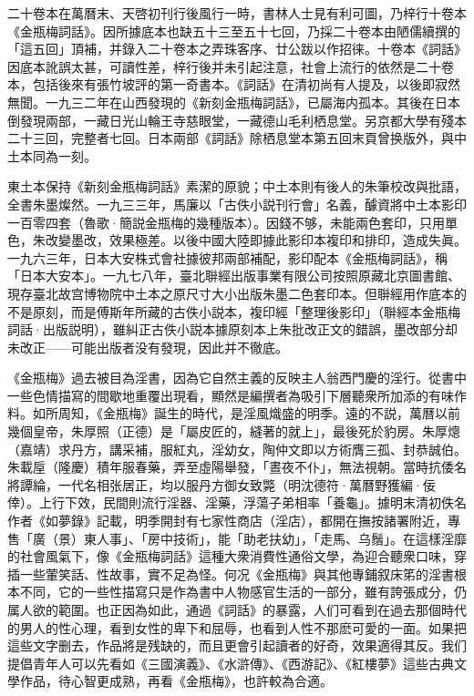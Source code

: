 二十卷本在萬曆末、天啓初刊行後風行一時，書林人士見有利可圖，乃梓行十卷本《金瓶梅詞話》。因所據底本也缺五十三至五十七回，乃採二十卷本由陋儒續撰的「這五回」頂補，并錄入二十卷本之弄珠客序、廿公跋以作招徕。十卷本《詞話》因底本訛誤太甚，可讀性差，梓行後并未引起注意，社會上流行的依然是二十卷本，包括後來有張竹坡評的第一奇書本。《詞話》在清初尚有人提及，以後即寂然無聞。一九三二年在山西發現的《新刻金瓶梅詞話》，已屬海内孤本。其後在日本倒發現兩部，一藏日光山輪王寺慈眼堂，一藏德山毛利栖息堂。另京都大學有殘本二十三回，完整者七回。日本兩部《詞話》除栖息堂本第五回末頁曾换版外，與中土本同為一刻。

東土本保持《新刻金瓶梅詞話》素潔的原貌；中土本則有後人的朱筆校改與批語，全書朱墨燦然。一九三三年，馬廉以「古佚小説刊行會」名義，醵資將中土本影印一百零四套{\innerzhushi（魯歌·簡説金瓶梅的幾種版本）}。因錢不够，未能兩色套印，只用單色，朱改變墨改，效果極差。以後中國大陸即據此影印本複印和排印，造成失眞。一九六三年，日本大安株式會社據彼邦兩部補配，影印配本《金瓶梅詞話》，稱「日本大安本」。一九七八年，臺北聨經出版事業有限公司按照原藏北京圖書館、現存臺北故宫博物院中土本之原尺寸大小出版朱墨二色套印本。但聨經用作底本的不是原刻，而是傅斯年所藏的古佚小説本，複印經「整理後影印」{\innerzhushi（聨經本金瓶梅詞話·出版説明）}，雖糾正古佚小説本據原刻本上朱批改正文的錯誤，墨改部分却未改正——可能出版者没有發現，因此并不徹底。

《金瓶梅》過去被目為淫書，因為它自然主義的反映主人翁西門慶的淫行。從書中一些色情描寫的間歇地重覆出現看，顯然是編撰者為吸引下層聽衆所加添的有味作料。如所周知，《金瓶梅》誕生的時代，是淫風熾盛的明季。遠的不説，萬曆以前幾個皇帝，朱厚照（正德）是「屬皮匠的，縫著的就上」，最後死於豹房。朱厚熜（嘉靖）求丹方，講采補，服紅丸，淫幼女，陶仲文即以方術膺三孤、封恭誠伯。朱載垕（隆慶）積年服春藥，弄至虛陽舉發，「晝夜不仆」，無法視朝。當時抗倭名將譚綸，一代名相张居正，均以服丹方御女致斃{\innerzhushi（明沈德符·萬曆野獲編·佞倖）}。上行下效，民間則流行淫器、淫藥，浮蕩子弟相率「養龜」。據明末清初佚名作者《如夢錄》記載，明季開封有七家性商店（淫店），都開在撫按諸署附近，專售「廣（景）東人事」、「房中技術」，能「助老扶幼」，「走馬、乌鬚」。在這樣淫靡的社會風氣下，像《金瓶梅詞話》這種大衆消費性通俗文學，為迎合聽衆口味，穿插一些葷笑話、性故事，實不足為怪。何况《金瓶梅》與其他專鋪叙床笫的淫書根本不同，它的一些性描寫只是作為書中人物感官生活的一部分，雖有誇張成分，仍属人欲的範圍。也正因為如此，通過《詞話》的暴露，人们可看到在過去那個時代的男人的性心理，看到女性的卑下和屈辱，也看到人性不那麽可愛的一面。如果把這些文字删去，作品將是残缺的，而且更會引起讀者的好奇，效果適得其反。我们提倡青年人可以先看如《三國演義》、《水滸傳》、《西游記》、《紅樓夢》這些古典文學作品，待心智更成熟，再看《金瓶梅》，也許較為合適。

